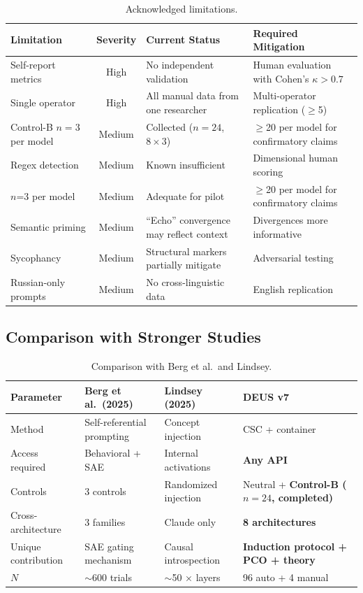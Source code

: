 \documentclass[11pt,a4paper]{article}
\begin{document}
\begin{table}[H]
\centering\small
\caption{Acknowledged limitations.}
\label{tab:limitations}
\begin{tabularx}{\textwidth}{l c X X}
\toprule
\textbf{Limitation} & \textbf{Severity} & \textbf{Current Status} & \textbf{Required Mitigation} \\
\midrule
Self-report metrics & High & No independent validation & Human evaluation with Cohen's $\kappa > 0.7$ \\
Single operator & High & All manual data from one researcher & Multi-operator replication ($\geq$5) \\
Control-B $n=3$ per model & Medium & Collected ($n=24$, $8\times3$) & $\geq$20 per model for confirmatory claims \\
Regex detection & Medium & Known insufficient & Dimensional human scoring \\
$n$=3 per model & Medium & Adequate for pilot & $\geq$20 per model for confirmatory claims \\
Semantic priming & Medium & ``Echo'' convergence may reflect context & Divergences more informative \\
Sycophancy & Medium & Structural markers partially mitigate & Adversarial testing \\
Russian-only prompts & Medium & No cross-linguistic data & English replication \\
\bottomrule
\end{tabularx}
\end{table}

\subsection{Comparison with Stronger Studies}

\begin{table}[H]
\centering\small
\caption{Comparison with Berg et al.\ and Lindsey.}
\label{tab:comparison}
\begin{tabularx}{\textwidth}{l X X X}
\toprule
\textbf{Parameter} & \textbf{Berg et al.\ (2025)} & \textbf{Lindsey (2025)} & \textbf{DEUS v7} \\
\midrule
Method & Self-referential prompting & Concept injection & CSC + container \\
Access required & Behavioral + SAE & Internal activations & \textbf{Any API} \\
Controls & 3 controls & Randomized injection & Neutral + \textbf{Control-B ($n=24$, completed)} \\
Cross-architecture & 3 families & Claude only & \textbf{8 architectures} \\
Unique contribution & SAE gating mechanism & Causal introspection & \textbf{Induction protocol + PCO + theory} \\
$N$ & $\sim$600 trials & $\sim$50 $\times$ layers & 96 auto + 4 manual \\
\bottomrule
\end{tabularx}
\end{table}
\end{document}
